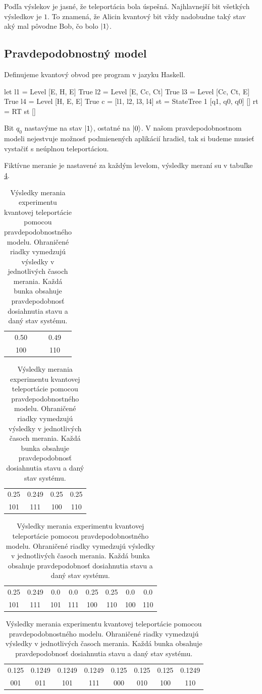 Podľa výslekov je jasné, že teleportácia bola úspešná. Najhlavnejší bit 
všetkých výsledkov je \(1\). To znamená, že Alicin kvantový bit vždy nadobudne
taký stav aký mal pôvodne Bob, čo bolo \(\ket{1}\).

\subsection*{Pravdepodobnostný model}
Definujeme kvantový obvod pre program v jazyku Haskell.

\begin{code}
let l1 = Level [E, H, E] True
    l2 = Level [E, Cc, Ct] True
    l3 = Level [Cc, Ct, E] True
    l4 = Level [H, E, E] True
    c = [l1, l2, l3, l4]
    st = StateTree 1 [q1, q0, q0] []
    rt = RT st []
\end{code}
   
Bit \(q_0\) nastavýme na stav \(\ket{1}\), ostatné na \(\ket{0}\). V našom
pravdepodobnostnom modeli nejestvuje možnosť podmienených aplikácií hradiel,
tak si budeme musieť vystačiť s neúplnou teleportáciou.

Fiktívne meranie je nastavené za každým levelom, výsledky meraní su v tabuľke
\ref{tel_results}.

\begin{table}
\centering

\begin{tabular}{|c|c|}
\hline
0.50 & 0.49 \\ 
100 & 110 \\ 
\hline
\end{tabular}

\begin{tabular}{|c|c|c|c|}
\hline
0.25 & 0.249 & 0.25 & 0.25 \\ 
101 & 111 & 100 & 110 \\ 
\hline
\end{tabular}

\begin{tabular}{|c|c|c|c|c|c|c|c|}
\hline
0.25 & 0.249 & 0.0 & 0.0 & 0.25 & 0.25 & 0.0 & 0.0 \\ 
101 & 111 & 101 & 111 & 100 & 110 & 100 & 110 \\ 
\hline
\end{tabular}

\begin{tabular}{|c|c|c|c|c|c|c|c|}
\hline
0.125 & 0.1249 & 0.1249 & 0.1249 & 0.125 & 0.125 & 0.125 & 0.1249 \\ 
001 & 011 & 101 & 111 & 000 & 010 & 100 & 110 \\ 
\hline
\end{tabular}

\caption{\label{tel_results} Výsledky merania experimentu kvantovej
teleportácie pomocou
pravdepodobnostného modelu. Ohraničené riadky vymedzujú výsledky v jednotlivých
 časoch merania. Každá bunka obsahuje pravdepodobnosť dosiahnutia stavu a 
daný stav systému.}
\end{table}

